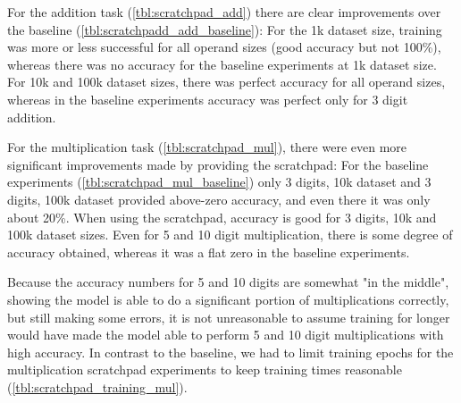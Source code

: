 For the addition task  (\cref{tbl:scratchpad_add}) there are clear improvements over the baseline (\cref{tbl:scratchpadd_add_baseline}): For the 1k dataset size, training was more or less successful for all operand sizes (good accuracy but not 100\%), whereas there was no accuracy for the baseline experiments at 1k dataset size.
For 10k and 100k dataset sizes, there was perfect accuracy for all operand sizes, whereas in the baseline experiments accuracy was perfect only for 3 digit addition.

\begin{table}[H]
	\begin{minipage}[t]{0.47\linewidth}
		\hfill
		\label{tbl:scratchpad_mul}
	\end{minipage}
	\hfill %
	\begin{minipage}[t]{0.47\linewidth}
		\hfill
		\label{tbl:scratchpad_mul_baseline}
	\end{minipage}
\end{table}


For the multiplication task (\cref{tbl:scratchpad_mul}), there were even more significant improvements made by providing the scratchpad: For the baseline experiments (\cref{tbl:scratchpad_mul_baseline}) only 3 digits, 10k dataset and 3 digits, 100k dataset provided above-zero accuracy, and even there it was only about 20\%. When using the scratchpad, accuracy is good for 
3 digits, 10k and 100k dataset sizes. Even for 5 and 10 digit multiplication, there is some degree of accuracy obtained, whereas it was a flat zero in the baseline experiments.

Because the accuracy numbers for 5 and 10 digits are somewhat "in the middle", showing the model is able to do a significant portion of multiplications correctly, but still making some errors, it is not unreasonable to assume training for longer would have made the model able to perform 5 and 10 digit multiplications with high accuracy. In contrast to the baseline, we had to limit training epochs for the multiplication scratchpad experiments to keep training times reasonable (\cref{tbl:scratchpad_training_mul}).

